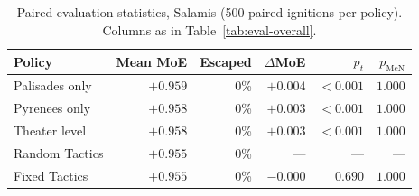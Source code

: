 \begin{table}[t]
  \centering
  \caption{Paired evaluation statistics, Salamis (500 paired ignitions per
    policy). Columns as in Table~\ref{tab:eval-overall}.}
  \label{tab:eval-salamis}
  \begin{tabular}{lrrrrr}
    \toprule
    Policy & Mean MoE & Escaped & $\Delta$MoE & $p_t$ & $p_{\mathrm{McN}}$ \\
    \midrule
    Palisades only & $+0.959$ & 0\% & $+0.004$ & $<\!0.001$ & $1.000$ \\
    Pyrenees only & $+0.958$ & 0\% & $+0.003$ & $<\!0.001$ & $1.000$ \\
    Theater level & $+0.958$ & 0\% & $+0.003$ & $<\!0.001$ & $1.000$ \\
    Random Tactics & $+0.955$ & 0\% & --- & --- & --- \\
    Fixed Tactics & $+0.955$ & 0\% & $-0.000$ & $0.690$ & $1.000$ \\
    \bottomrule
  \end{tabular}
\end{table}
